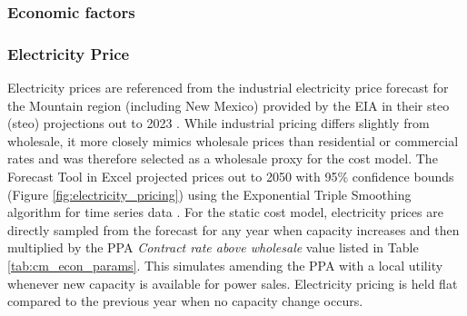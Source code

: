 \subsubsection{Economic factors}\label{ch4:econ_params}
\begin{table}[H]
\centering
{}
\caption[Cost model parameters for economics]{Parameters related to economic factors in the cost model}
\label{tab:cm_econ_params}
\end{table}

\subsubsection{Electricity Price}\label{ch4:elec_price}
Electricity prices are referenced from the industrial electricity price forecast for the Mountain region (including New Mexico) provided by the EIA in their \acrlong{steo} (\acrshort{steo}) projections out to 2023 \citep{eia_short-term_2021}. While industrial pricing differs slightly from wholesale, it more closely mimics wholesale prices than residential or commercial rates and was therefore selected as a wholesale proxy for the cost model. The Forecast Tool in Excel projected prices out to 2050 with 95\% confidence bounds (Figure \ref{fig:electricity_pricing}) using the Exponential Triple Smoothing algorithm for time series data \citep{microsoft_forecastets_2021}. For the static cost model, electricity prices are directly sampled from the forecast for any year when capacity increases and then multiplied by the PPA \textit{Contract rate above wholesale} value listed in Table \ref{tab:cm_econ_params}. This simulates amending the PPA with a local utility whenever new capacity is available for power sales. Electricity pricing is held flat compared to the previous year when no capacity change occurs.

